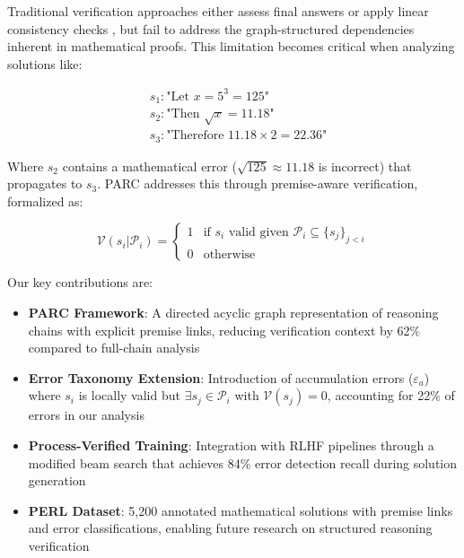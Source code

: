 \documentclass{article}
\begin{document}
Traditional verification approaches either assess final answers \cite{hendrycks2021math} or apply linear consistency checks \cite{prasad2023receval}, but fail to address the graph-structured dependencies inherent in mathematical proofs. This limitation becomes critical when analyzing solutions like:

\begin{equation}
\begin{aligned}
&s_1: \text{"Let } x = 5^{3} = 125\text{"} \\
&s_2: \text{"Then } \sqrt{x} = 11.18\text{"} \\
&s_3: \text{"Therefore } 11.18 \times 2 = 22.36\text{"}
\end{aligned}
\end{equation}

Where $s_2$ contains a mathematical error ($\sqrt{125} \approx 11.18$ is incorrect) that propagates to $s_3$. PARC addresses this through premise-aware verification, formalized as:

\begin{equation}
\mathcal{V}(s_i|\mathcal{P}_i) = \begin{cases}
1 & \text{if } s_i \text{ valid given } \mathcal{P}_i \subseteq \{s_j\}_{j<i} \\
0 & \text{otherwise}
\end{cases}
\end{equation}

Our key contributions are:

\begin{itemize}
\item \textbf{PARC Framework}: A directed acyclic graph representation of reasoning chains with explicit premise links, reducing verification context by 62\% compared to full-chain analysis

\item \textbf{Error Taxonomy Extension}: Introduction of accumulation errors ($\varepsilon_a$) where $s_i$ is locally valid but $\exists s_j \in \mathcal{P}_i$ with $\mathcal{V}(s_j) = 0$, accounting for 22\% of errors in our analysis

\item \textbf{Process-Verified Training}: Integration with RLHF pipelines \cite{ouyang2022training} through a modified beam search that achieves 84\% error detection recall during solution generation

\item \textbf{PERL Dataset}: 5,200 annotated mathematical solutions with premise links and error classifications, enabling future research on structured reasoning verification
\end{itemize}
\end{document}
